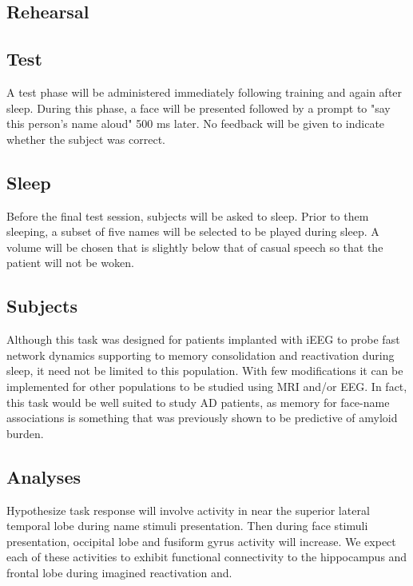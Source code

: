 \subsection*{Rehearsal}

\subsection*{Test}
A test phase will be administered immediately following training and again after sleep. During this phase, a face will be presented followed by a prompt to "say this person's name aloud" 500 ms later. No feedback will be given to indicate whether the subject was correct.

\subsection*{Sleep}
Before the final test session, subjects will be asked to sleep. Prior to them sleeping, a subset of five names will be selected to be played during sleep. A volume will be chosen that is slightly below that of casual speech so that the patient will not be woken.
\cite{Sharon2017}

\subsection*{Subjects}
Although this task was designed for patients implanted with iEEG to probe fast network dynamics supporting to memory consolidation and reactivation during sleep, it need not be limited to this population. With few modifications it can be implemented for other populations to be studied using MRI and/or EEG. In fact, this task would be well suited to study AD patients, as memory for face-name associations is something that was previously shown to be predictive of amyloid burden.

\subsection*{Analyses}
Hypothesize task response will involve activity in near the superior lateral temporal lobe during name stimuli presentation. Then during face stimuli presentation, occipital lobe and fusiform gyrus activity will increase. We expect each of these activities to exhibit functional connectivity to the hippocampus and frontal lobe during imagined reactivation and.

